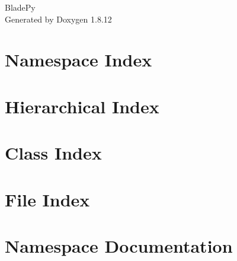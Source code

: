 \documentclass[twoside]{book}
\newcommand{\+}{\discretionary{\mbox{\scriptsize$\hookleftarrow$}}{}{}}
\newcommand{\clearemptydoublepage}{%
  \newpage{\pagestyle{empty}\cleardoublepage}%
}
\begin{document}
\hypersetup{pageanchor=false,
             bookmarksnumbered=true,
             pdfencoding=unicode
            }
\begin{titlepage}
\vspace*{7cm}
\begin{center}%
{\Large Blade\+Py }\\
\vspace*{1cm}
{\large Generated by Doxygen 1.8.12}\\
\end{center}
\end{titlepage}
\clearemptydoublepage
{}
\tableofcontents
\clearemptydoublepage
{}
\hypersetup{pageanchor=true}

\chapter{Namespace Index}

\chapter{Hierarchical Index}

\chapter{Class Index}

\chapter{File Index}

\chapter{Namespace Documentation}




















\end{document}
